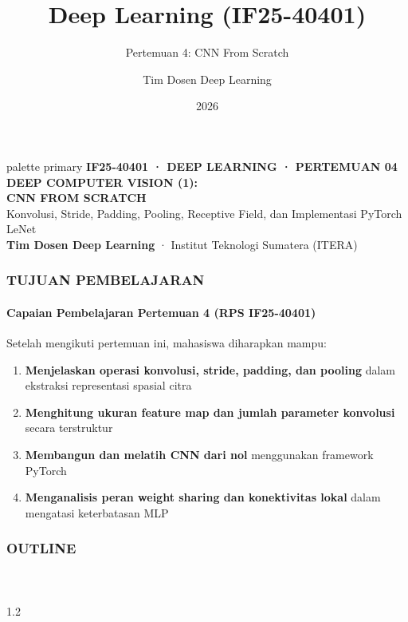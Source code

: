 \documentclass[t,aspectratio=169,xcolor=dvipsnames]{beamer}
\title[Pertemuan 4: CNN From Scratch]{Deep Learning (IF25-40401)}
\subtitle{Pertemuan 4: CNN From Scratch}
\author{Tim Dosen Deep Learning}
\institute{Teknik Informatika — Institut Teknologi Sumatera (ITERA)}
\date{2026}
\begin{document}
\begin{frame}[plain]
  \begin{beamercolorbox}[wd=\paperwidth,ht=\paperheight,sep=1.5cm]{palette primary}
    \vspace{0.8cm}
    {\scriptsize\bfseries\color{dlMute}IF25-40401 · DEEP LEARNING · PERTEMUAN 04}\\[0.4cm]
    {\Huge\bfseries DEEP COMPUTER VISION (1):\\CNN FROM SCRATCH}\\[0.4cm]
    {\small Konvolusi, Stride, Padding, Pooling, Receptive Field, dan Implementasi PyTorch LeNet}\\[1.0cm]
    \vfill
    {\scriptsize\textbf{Tim Dosen Deep Learning} · Institut Teknologi Sumatera (ITERA)}
  \end{beamercolorbox}
\end{frame}

\begin{frame}[plain]

    \frametitle{TUJUAN PEMBELAJARAN} 
    \framesubtitle{Capaian Pembelajaran Pertemuan 4 (RPS IF25-40401)}

    \begin{exampleblock}{Setelah mengikuti pertemuan ini, mahasiswa diharapkan mampu:}
        \begin{enumerate}
            \item \textbf{Menjelaskan operasi konvolusi, stride, padding, dan pooling} dalam ekstraksi representasi spasial citra
            \item \textbf{Menghitung ukuran feature map dan jumlah parameter konvolusi} secara terstruktur
            \item \textbf{Membangun dan melatih CNN dari nol} menggunakan framework PyTorch
            \item \textbf{Menganalisis peran weight sharing dan konektivitas lokal} dalam mengatasi keterbatasan MLP
        \end{enumerate}
    \end{exampleblock}
    
\end{frame}

\begin{frame}[plain]

    \frametitle{OUTLINE} 
    \framesubtitle{~}

    \begin{spacing}{1.2}
        \tableofcontents
    \end{spacing}
    
\end{frame}
\end{document}
